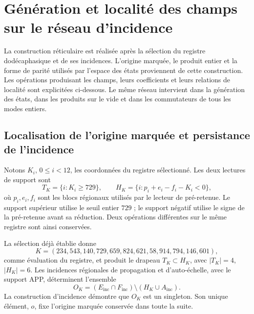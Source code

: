 \section[Champs sur le réseau d’incidence]{Génération et localité des champs sur le réseau d’incidence}
\label{sec:df-campos-reticulares}

La construction réticulaire est réalisée après la sélection du registre dodécaphasique et de ses incidences. L’origine marquée, le produit entier et la forme de parité utilisés par l’espace des états proviennent de cette construction. Les opérations produisant les champs, leurs coefficients et leurs relations de localité sont explicitées ci-dessous. Le même réseau intervient dans la génération des états, dans les produits sur le vide et dans les commutateurs de tous les modes entiers.

\subsection{Localisation de l’origine marquée et persistance de l’incidence}


Notons \(K_i\), \(0\leq i<12\), les coordonnées du registre sélectionné. Les deux lectures de support sont
\begin{equation}
 T_K=\{i:K_i\geq729\},\qquad
 H_K=\{i:p_i+e_i-f_i-K_i<0\},
 \label{eq:df-soportes-K}
\end{equation}
où \(p_i,e_i,f_i\) sont les blocs régionaux utilisés par le lecteur de pré-retenue. Le support supérieur utilise le seuil entier \(729\) ; le support négatif utilise le signe de la pré-retenue avant sa réduction. Deux opérations différentes sur le même registre sont ainsi conservées.

La sélection déjà établie donne
\[
 K=(234,543,140,729,659,824,621,58,914,794,146,601),
\]
comme évaluation du registre, et produit le drapeau \(T_K\subset H_K\), avec \(|T_K|=4\), \(|H_K|=6\). Les incidences régionales de propagation et d’auto-échelle, avec le support APP, déterminent l’ensemble
\[
 O_K=(E_{\mathrm{inc}}\cap F_{\mathrm{inc}})
       \setminus(H_K\cup A_{\mathrm{inc}}).
\]
La construction d’incidence démontre que \(O_K\) est un singleton. Son unique élément, \(o\), fixe l’origine marquée conservée dans toute la suite.

